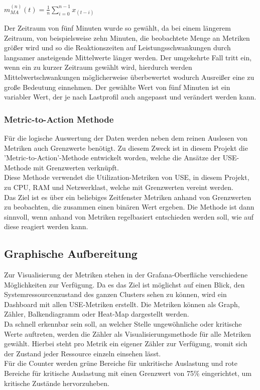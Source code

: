 \documentclass[a4paper,10pt]{scrartcl}
\begin{document}
\begin{Huge}
\(
\displaystyle{m^{(n)}_{MA}(t) = \frac{1}{n}{\sum\limits_{i=0}^{{n-1}} x_{(t-i)}} }
\)\\
\end{Huge}

Der Zeitraum von fünf Minuten wurde so gewählt, da bei einem längerem Zeitraum, von beispielsweise zehn Minuten, die beobachtete Menge an Metriken größer wird und so die Reaktionszeiten auf Leistungsschwankungen durch langsamer ansteigende Mittelwerte länger werden.
Der umgekehrte Fall tritt ein, wenn ein zu kurzer Zeitraum gewählt wird, hierdurch werden Mittelwertschwankungen möglicherweise überbewertet wodurch Ausreißer eine zu große Bedeutung einnehmen.
Der gewählte Wert von fünf Minuten ist ein variabler Wert, der je nach Lastprofil auch angepasst und verändert werden kann.

\subsubsection{Metric-to-Action Methode}

Für die logische Auswertung der Daten werden neben dem reinen Auslesen von Metriken auch Grenzwerte benötigt. Zu diesem Zweck ist in diesem Projekt die 'Metric-to-Action'-Methode entwickelt worden, welche die Ansätze der USE-Methode mit Grenzwerten verknüpft.\\
Diese Methode verwendet die Utilization-Metriken von USE, in diesem Projekt, zu CPU, RAM und Netzwerklast, welche mit Grenzwerten vereint werden.\\
Das Ziel ist es über ein beliebiges Zeitfenster Metriken anhand von Grenzwerten zu beobachten, die zusammen einen binären Wert ergeben. Die Methode ist dann sinnvoll, wenn anhand von Metriken regelbasiert entschieden werden soll, wie auf diese reagiert werden kann.

\subsection{Graphische Aufbereitung}

Zur Visualisierung der Metriken stehen in der Grafana-Oberfläche verschiedene Möglichkeiten zur Verfügung. Da es das Ziel ist möglichst auf einen Blick, den Systemressourcenzustand des ganzen Clusters sehen zu können, wird ein Dashboard mit allen USE-Metriken erstellt. Die Metriken können als Graph, Zähler, Balkendiagramm oder Heat-Map dargestellt werden.\\
Da schnell erkennbar sein soll, an welcher Stelle ungewöhnliche oder kritische Werte auftreten, werden die Zähler als Visualisierungsmethode für alle Metriken gewählt. Hierbei steht pro Metrik ein eigener Zähler zur Verfügung, womit sich der Zustand jeder Ressource einzeln einsehen lässt.\\
Für die Counter werden grüne Bereiche für unkritische Auslastung und rote Bereiche für kritische Auslastung mit einen Grenzwert von 75\% eingerichtet, um kritische Zustände hervorzuheben.
\end{document}
